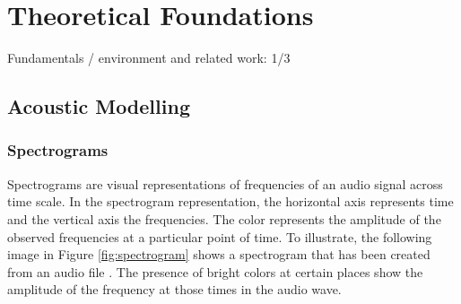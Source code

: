 
\chapter{Theoretical Foundations}%
\label{sec:fundamentals}

Fundamentals / environment and related work: 1/3

\section{Acoustic Modelling}%
\label{sec:acousticmodelling}

\subsection{Spectrograms}%
\label{sec:spectrograms}

Spectrograms are visual representations of frequencies of an audio signal across time scale. In the spectrogram representation, the horizontal axis represents time and the vertical axis the frequencies. The color represents the amplitude of the observed frequencies at a particular point of time. To illustrate, the following image in Figure \ref{fig:spectrogram} shows a spectrogram that has been created from an audio file  \cite{mcfee2015librosa}  . The presence of bright colors at certain places show the amplitude of the frequency at those times in the audio wave. 


